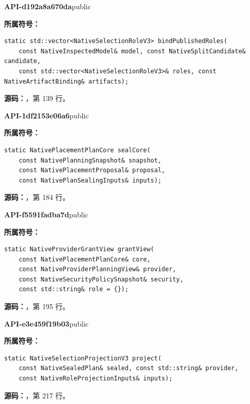 \textbf{API-d192a8a670da}\quad public\par
\textbf{所属符号：}\par
\begin{Verbatim}[fontsize=\footnotesize,breaklines,breakanywhere]
static std::vector<NativeSelectionRoleV3> bindPublishedRoles(
    const NativeInspectedModel& model, const NativeSplitCandidate& candidate,
    const std::vector<NativeSelectionRoleV3>& roles, const NativeArtifactBinding& artifacts);
\end{Verbatim}
\textbf{源码：}，第 139 行。\par

\textbf{API-1df2153e06a6}\quad public\par
\textbf{所属符号：}\par
\begin{Verbatim}[fontsize=\footnotesize,breaklines,breakanywhere]
static NativePlacementPlanCore sealCore(
    const NativePlanningSnapshot& snapshot,
    const NativePlacementProposal& proposal,
    const NativePlanSealingInputs& inputs);
\end{Verbatim}
\textbf{源码：}，第 184 行。\par

\textbf{API-f5591fadba7d}\quad public\par
\textbf{所属符号：}\par
\begin{Verbatim}[fontsize=\footnotesize,breaklines,breakanywhere]
static NativeProviderGrantView grantView(
    const NativePlacementPlanCore& core,
    const NativeProviderPlanningView& provider,
    const NativeSecurityPolicySnapshot& security,
    const std::string& role = {});
\end{Verbatim}
\textbf{源码：}，第 195 行。\par

\textbf{API-e3e459f19b03}\quad public\par
\textbf{所属符号：}\par
\begin{Verbatim}[fontsize=\footnotesize,breaklines,breakanywhere]
static NativeSelectionProjectionV3 project(
    const NativeSealedPlan& sealed, const std::string& provider,
    const NativeRoleProjectionInputs& inputs);
\end{Verbatim}
\textbf{源码：}，第 217 行。\par


